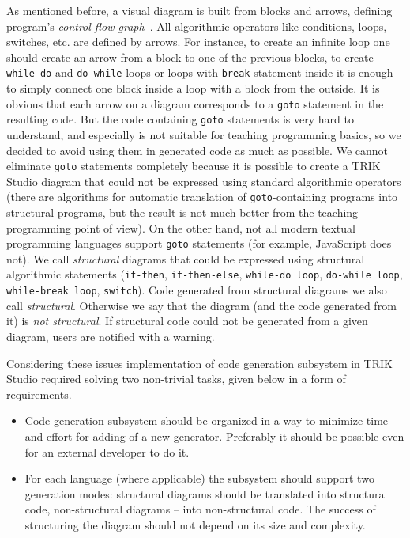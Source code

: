 \documentclass[conference]{IEEEtran}
\begin{document}
As mentioned before, a visual diagram is built from blocks and arrows, defining program's \textit{control flow graph}~\cite{steven1997advanced}. All algorithmic operators like conditions, loops, switches, etc. are defined by arrows. For instance, to create an infinite loop one should create an arrow from a block to one of the previous blocks, to create \texttt{while-do} and \texttt{do-while} loops or loops with \texttt{break} statement inside it is enough to simply connect one block inside a loop with a block from the outside. It is obvious that each arrow on a diagram corresponds to a \texttt{goto} statement in the resulting code. But the code containing \texttt{goto} statements is very hard to understand, and especially is not suitable for teaching programming basics, so we decided to avoid using them in generated code as much as possible. We cannot eliminate \texttt{goto} statements completely because it is possible to create a TRIK Studio diagram that could not be expressed using standard algorithmic operators (there are algorithms for automatic translation of \texttt{goto}-containing programs into structural programs, but the result is not much better from the teaching programming point of view). On the other hand, not all modern textual programming languages support \texttt{goto} statements (for example, JavaScript does not). We call \textit{structural} diagrams that could be expressed using structural algorithmic statements (\texttt{if-then}, \texttt{if-then-else}, \texttt{while-do loop}, \texttt{do-while loop}, \texttt{while-break loop}, \texttt{switch}). Code generated from structural diagrams we also call \textit{structural}. Otherwise we say that the diagram (and the code generated from it) is \textit{not structural}. If structural code could not be generated from a given diagram, users are notified with a warning.

Considering these issues implementation of code generation subsystem in TRIK Studio required solving two non-trivial tasks, given below in a form of requirements.
 
\begin{itemize}
    \item Code generation subsystem should be organized in a way to minimize time and effort for adding of a new generator. Preferably it should be possible even for an external developer to do it.
    \item For each language (where applicable) the subsystem should support two generation modes: structural diagrams should be translated into structural code, non-structural diagrams -- into non-structural code. The success of structuring the diagram should not depend on its size and complexity.
\end{itemize}
\end{document}
